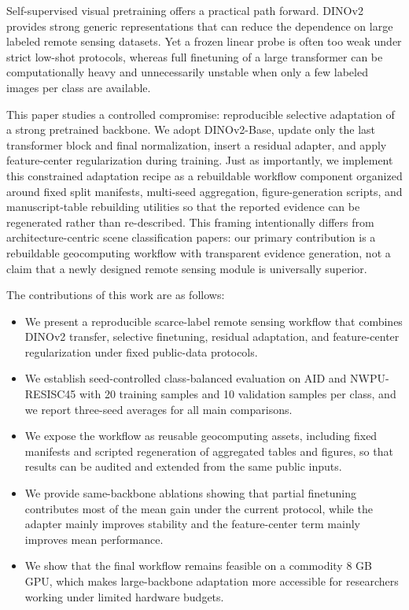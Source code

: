 \documentclass[a4paper,fleqn]{cas-sc}
\begin{document}
Self-supervised visual pretraining offers a practical path forward. DINOv2~\cite{oquab2023dinov2} provides strong generic representations that can reduce the dependence on large labeled remote sensing datasets. Yet a frozen linear probe is often too weak under strict low-shot protocols, whereas full finetuning of a large transformer can be computationally heavy and unnecessarily unstable when only a few labeled images per class are available.

This paper studies a controlled compromise: reproducible selective adaptation of a strong pretrained backbone. We adopt DINOv2-Base, update only the last transformer block and final normalization, insert a residual adapter, and apply feature-center regularization during training. Just as importantly, we implement this constrained adaptation recipe as a rebuildable workflow component organized around fixed split manifests, multi-seed aggregation, figure-generation scripts, and manuscript-table rebuilding utilities so that the reported evidence can be regenerated rather than re-described. This framing intentionally differs from architecture-centric scene classification papers: our primary contribution is a rebuildable geocomputing workflow with transparent evidence generation, not a claim that a newly designed remote sensing module is universally superior.

The contributions of this work are as follows:
\begin{itemize}
  \item We present a reproducible scarce-label remote sensing workflow that combines DINOv2 transfer, selective finetuning, residual adaptation, and feature-center regularization under fixed public-data protocols.
  \item We establish seed-controlled class-balanced evaluation on AID and NWPU-RESISC45 with 20 training samples and 10 validation samples per class, and we report three-seed averages for all main comparisons.
  \item We expose the workflow as reusable geocomputing assets, including fixed manifests and scripted regeneration of aggregated tables and figures, so that results can be audited and extended from the same public inputs.
  \item We provide same-backbone ablations showing that partial finetuning contributes most of the mean gain under the current protocol, while the adapter mainly improves stability and the feature-center term mainly improves mean performance.
  \item We show that the final workflow remains feasible on a commodity 8 GB GPU, which makes large-backbone adaptation more accessible for researchers working under limited hardware budgets.
\end{itemize}
\end{document}
